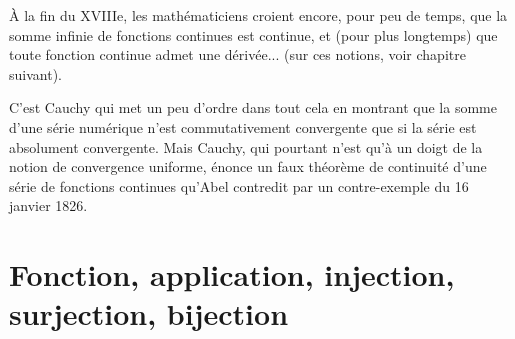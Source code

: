 \begin{histoire}
\medskip
À la fin du XVIIIe, les mathématiciens croient encore, pour peu de temps, que la somme infinie de
fonctions continues est continue, et (pour plus longtemps) que toute fonction continue admet une dérivée...
(sur ces notions, voir chapitre suivant).

C'est Cauchy
 qui met un peu d'ordre dans tout cela en montrant que la somme d'une série numérique
n'est commutativement convergente que si la série est absolument convergente.
Mais Cauchy, qui pourtant n'est qu'à un doigt de la notion de convergence uniforme, énonce un faux
théorème de continuité d'une série de fonctions continues qu'Abel
 contredit par un contre-exemple
du 16 janvier 1826.
\end{histoire}



\medskip
\section{Fonction, application, injection, surjection, bijection}


